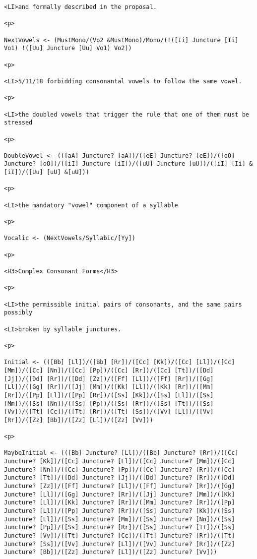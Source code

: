 \documentclass[12pt]{article}
\begin{document}
\begin{lstlisting}
<LI>and formally described in the proposal.

<p>

NextVowels <- (MustMono/(Vo2 &MustMono)/Mono/(!([Ii] Juncture [Ii] Vo1) !([Uu] Juncture [Uu] Vo1) Vo2))

<p>

<LI>5/11/18 forbidding consonantal vowels to follow the same vowel.

<p>

<LI>the doubled vowels that trigger the rule that one of them must be stressed

<p>

DoubleVowel <- (([aA] Juncture? [aA])/([eE] Juncture? [eE])/([oO] Juncture? [oO])/([iI] Juncture [iI])/([uU] Juncture [uU])/([iI] [Ii] &[iI])/([Uu] [uU] &[uU]))

<p>

<LI>the mandatory "vowel" component of a syllable

<p>

Vocalic <- (NextVowels/Syllabic/[Yy])

<p>

<H3>Complex Consonant Forms</H3>

<p>

<LI>the permissible initial pairs of consonants, and the same pairs possibly

<LI>broken by syllable junctures.

<p>

Initial <- (([Bb] [Ll])/([Bb] [Rr])/([Cc] [Kk])/([Cc] [Ll])/([Cc] [Mm])/([Cc] [Nn])/([Cc] [Pp])/([Cc] [Rr])/([Cc] [Tt])/([Dd] [Jj])/([Dd] [Rr])/([Dd] [Zz])/([Ff] [Ll])/([Ff] [Rr])/([Gg] [Ll])/([Gg] [Rr])/([Jj] [Mm])/([Kk] [Ll])/([Kk] [Rr])/([Mm] [Rr])/([Pp] [Ll])/([Pp] [Rr])/([Ss] [Kk])/([Ss] [Ll])/([Ss] [Mm])/([Ss] [Nn])/([Ss] [Pp])/([Ss] [Rr])/([Ss] [Tt])/([Ss] [Vv])/([Tt] [Cc])/([Tt] [Rr])/([Tt] [Ss])/([Vv] [Ll])/([Vv] [Rr])/([Zz] [Bb])/([Zz] [Ll])/([Zz] [Vv]))

<p>

MaybeInitial <- (([Bb] Juncture? [Ll])/([Bb] Juncture? [Rr])/([Cc] Juncture? [Kk])/([Cc] Juncture? [Ll])/([Cc] Juncture? [Mm])/([Cc] Juncture? [Nn])/([Cc] Juncture? [Pp])/([Cc] Juncture? [Rr])/([Cc] Juncture? [Tt])/([Dd] Juncture? [Jj])/([Dd] Juncture? [Rr])/([Dd] Juncture? [Zz])/([Ff] Juncture? [Ll])/([Ff] Juncture? [Rr])/([Gg] Juncture? [Ll])/([Gg] Juncture? [Rr])/([Jj] Juncture? [Mm])/([Kk] Juncture? [Ll])/([Kk] Juncture? [Rr])/([Mm] Juncture? [Rr])/([Pp] Juncture? [Ll])/([Pp] Juncture? [Rr])/([Ss] Juncture? [Kk])/([Ss] Juncture? [Ll])/([Ss] Juncture? [Mm])/([Ss] Juncture? [Nn])/([Ss] Juncture? [Pp])/([Ss] Juncture? [Rr])/([Ss] Juncture? [Tt])/([Ss] Juncture? [Vv])/([Tt] Juncture? [Cc])/([Tt] Juncture? [Rr])/([Tt] Juncture? [Ss])/([Vv] Juncture? [Ll])/([Vv] Juncture? [Rr])/([Zz] Juncture? [Bb])/([Zz] Juncture? [Ll])/([Zz] Juncture? [Vv]))


\end{lstlisting}
\end{document}
